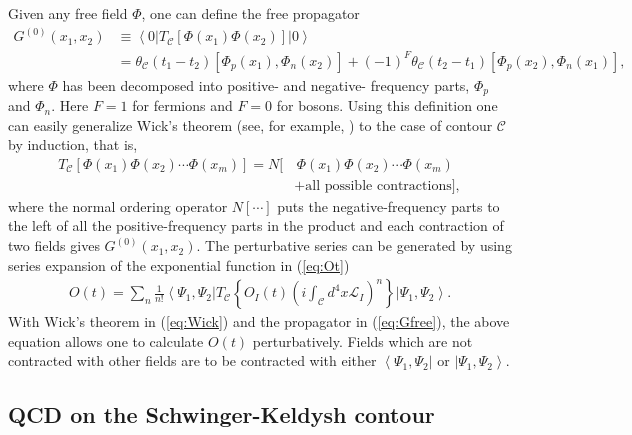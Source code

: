 \documentclass[onecolumn,showpacs,nobibnotes,nofootinbib,12pt,aps,prd,showpacs,notitlepage,nofootinbib,preprintnumbers,amsmath,amssymb]{article}
\begin{document}
Given any free field $\Phi$, one can define the free propagator
\begin{align}
  G^{(0)}(x_1,x_2) & \equiv\left<0|T_{\mathcal{C}}[ \Phi(x_1)\Phi(x_2)]|0\right> \nonumber\\
  &=\theta_\mathcal{C}(t_1-t_2)[\Phi_p(x_1),\Phi_n(x_2)]+(-1)^F\theta_\mathcal{C}(t_2-t_1)[\Phi_p(x_2),\Phi_n(x_1)],\label{eq:Gfree}
\end{align}
where $\Phi$ has been decomposed into positive- and negative-
frequency parts, $\Phi_p$ and $\Phi_n$. Here $F=1$ for fermions and
$F=0$ for bosons. Using this definition one can easily generalize
Wick's theorem (see, for example, \cite{Peskin:1995ev}) to the case of
contour $\mathcal{C}$ by induction, that is,
\begin{align}
  T_{\mathcal{C}}[\Phi(x_1)\Phi(x_2)\cdots \Phi(x_m)] =
  N[& \, \Phi(x_1)\Phi(x_2)\cdots \Phi(x_m) \nonumber\\
  & + \text{all possible contractions}],\label{eq:Wick}
\end{align}
where the normal ordering operator $N[\cdots]$ puts the
negative-frequency parts to the left of all the positive-frequency
parts in the product and each contraction of two fields gives
$G^{(0)}(x_1,x_2)$. The perturbative series can be generated by using
series expansion of the exponential function in (\ref{eq:Ot})
\begin{align}
  O(t) =
  \sum\limits_{n}\frac{1}{n!}\left<\Psi_1,\Psi_2\right|T_{\mathcal{C}}
  \left\{ O_I(t) \left(i\int_{\mathcal{C}} d^4 x
      \mathcal{L}_I\right)^n \right\} \left|\Psi_1,\Psi_2\right>.
\end{align}
With Wick's theorem in (\ref{eq:Wick}) and the propagator in
(\ref{eq:Gfree}), the above equation allows one to calculate $O(t)$
perturbatively. Fields which are not contracted with other fields are
to be contracted with either $\left<\Psi_1,\Psi_2\right|$ or
$\left|\Psi_1,\Psi_2\right>$.



\subsection{QCD on the Schwinger-Keldysh contour}
\end{document}
